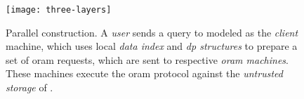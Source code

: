 \begin{figure}[ht!]
	\centering
	\texttt{[image: three-layers]}
	\caption[Parallel \epsolute{} construction]{
		Parallel \epsolute{} construction.
		A \emph{user} sends a query to \user{} modeled as the \emph{client} machine, which uses local \emph{data index} and \emph{\acrshort{dp} structures} to prepare a set of \acrshort{oram} requests, which are sent to respective \emph{\acrshort{oram} machines}.
		These machines execute the \acrshort{oram} protocol against the \emph{untrusted storage} of \server{}.
	}%
	\label{figure:three-tier}
\end{figure}
